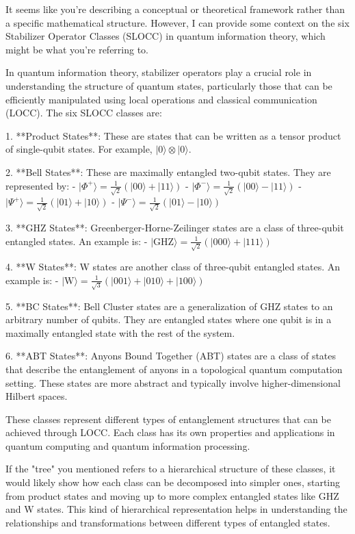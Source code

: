 It seems like you're describing a conceptual or theoretical framework rather than a specific mathematical structure. However, I can provide some context on the six Stabilizer Operator Classes (SLOCC) in quantum information theory, which might be what you're referring to.

In quantum information theory, stabilizer operators play a crucial role in understanding the structure of quantum states, particularly those that can be efficiently manipulated using local operations and classical communication (LOCC). The six SLOCC classes are:

1. **Product States**: These are states that can be written as a tensor product of single-qubit states. For example, \( |0\rangle \otimes |0\rangle \).

2. **Bell States**: These are maximally entangled two-qubit states. They are represented by:
   - \( |\Phi^+\rangle = \frac{1}{\sqrt{2}}(|00\rangle + |11\rangle) \)
   - \( |\Phi^-\rangle = \frac{1}{\sqrt{2}}(|00\rangle - |11\rangle) \)
   - \( |\Psi^+\rangle = \frac{1}{\sqrt{2}}(|01\rangle + |10\rangle) \)
   - \( |\Psi^-\rangle = \frac{1}{\sqrt{2}}(|01\rangle - |10\rangle) \)

3. **GHZ States**: Greenberger-Horne-Zeilinger states are a class of three-qubit entangled states. An example is:
   - \( |\text{GHZ}\rangle = \frac{1}{\sqrt{2}}(|000\rangle + |111\rangle) \)

4. **W States**: W states are another class of three-qubit entangled states. An example is:
   - \( |\text{W}\rangle = \frac{1}{\sqrt{3}}(|001\rangle + |010\rangle + |100\rangle) \)

5. **BC States**: Bell Cluster states are a generalization of GHZ states to an arbitrary number of qubits. They are entangled states where one qubit is in a maximally entangled state with the rest of the system.

6. **ABT States**: Anyons Bound Together (ABT) states are a class of states that describe the entanglement of anyons in a topological quantum computation setting. These states are more abstract and typically involve higher-dimensional Hilbert spaces.

These classes represent different types of entanglement structures that can be achieved through LOCC. Each class has its own properties and applications in quantum computing and quantum information processing.

If the "tree" you mentioned refers to a hierarchical structure of these classes, it would likely show how each class can be decomposed into simpler ones, starting from product states and moving up to more complex entangled states like GHZ and W states. This kind of hierarchical representation helps in understanding the relationships and transformations between different types of entangled states.